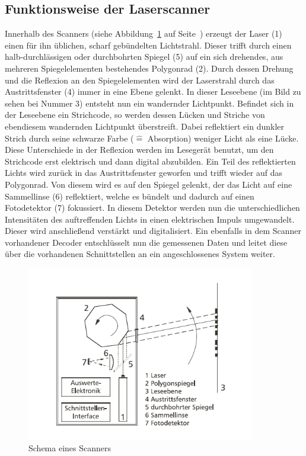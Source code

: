 \subsection{Funktionsweise der Laserscanner}
Innerhalb des Scanners (siehe Abbildung~\ref{fig:scannerschema} auf Seite~\pageref{fig:scannerschema}) erzeugt der Laser (1) einen für ihn üblichen, scharf gebündelten Lichtstrahl. Dieser trifft durch einen halb-durchlässigen oder durchbohrten Spiegel (5) auf ein sich drehendes, aus mehreren Spiegelelementen bestehendes Polygonrad (2). Durch dessen Drehung und die Reflexion an den Spiegelelementen wird der Laserstrahl durch das Austrittsfenster (4) immer in eine Ebene gelenkt.
In dieser Leseebene (im Bild zu sehen bei Nummer 3) entsteht nun ein wandernder Lichtpunkt. 
Befindet sich in der Leseebene ein Strichcode, so werden dessen Lücken und Striche von ebendiesem wandernden Lichtpunkt überstreift. Dabei reflektiert ein dunkler Strich durch seine schwarze Farbe ($\widehat{=}$ Absorption) weniger Licht als eine Lücke. Diese Unterschiede in der Reflexion werden im Lesegerät benutzt, um den Strichcode erst elektrisch und dann digital abzubilden. Ein Teil des reflektierten Lichts wird zurück in das Austrittsfenster geworfen und trifft wieder auf das Polygonrad. 
Von diesem wird es auf den Spiegel gelenkt, der das Licht auf eine Sammellinse (6) reflektiert, welche es bündelt und dadurch auf einen Fotodetektor (7) fokussiert.\pagebreak
In diesem Detektor werden nun die unterschiedlichen Intensitäten des auftreffenden Lichts in einen elektrischen Impuls umgewandelt. Dieser wird anschließend verstärkt und digitalisiert. Ein ebenfalls in dem Scanner vorhandener Decoder entschlüsselt nun die gemessenen Daten und leitet diese über die vorhandenen Schnittstellen an ein angeschlossenes System weiter. 
\begin{figure}[htbp]
	\centering
		\includegraphics[width=10cm]{Bilder/Schema_Scanner.png}
		\caption[Schema eines Scanners]{Schema eines Scanners\footnotemark}
		\label{fig:scannerschema}
	\hfill
\end{figure}

